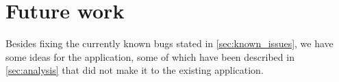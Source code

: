 \section{Future work}
Besides fixing the currently known bugs stated in \ref{sec:known_issues}, we have some ideas for the application, some of which have been described in \ref{sec:analysis} that did not make it to the existing application.

